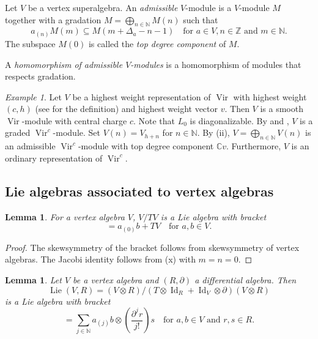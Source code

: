 \documentclass[a4paper, 12pt, reqno]{amsart}
\newtheorem{lemma}[theorem]{Lemma}
\theoremstyle{remark}
\newtheorem{example}[theorem]{Example}
\numberwithin{equation}{subsection}
\DeclareMathOperator{\Vir}{Vir}
\DeclareMathOperator{\Id}{Id}
\DeclareMathOperator{\Lie}{Lie}
\begin{document}
Let $V$ be a vertex superalgebra.
An \emph{admissible} $V$-module is a $V$-module $M$ together with a gradation $M = \bigoplus_{n \in \mathbb{N}}M(n)$ such that
\begin{equation*}
  a_{(n)}M(m) \subseteq M(m + \Delta_a - n - 1) \quad \text{for }a \in V, n \in \mathbb{Z}\text{ and }m \in \mathbb{N}.
\end{equation*}
The subspace $M(0)$ is called the \emph{top degree component} of $M$.

A \emph{homomorphism of admissible $V$-modules} is a homomorphism of modules that respects gradation.

\begin{example}
  \label{exa:11}
  Let $V$ be a highest weight representation of $\Vir$ with highest weight $(c, h)$ (see  for the definition) and highest weight vector $v$.
  Then $V$ is a smooth $\Vir$-module with central charge $c$.
  Note that $L_0$ is diagonalizable.
  By  and , $V$ is a graded $\Vir^c$-module.
  Set $V(n) = V_{h + n}$ for $n \in \mathbb{N}$.
  By (ii), $V = \bigoplus_{n \in \mathbb{N}}V(n)$ is an admissible $\Vir^c$-module with top degree component $\mathbb{C}v$.
  Furthermore, $V$ is an ordinary representation of $\Vir^c$.
\end{example}

\subsection{Lie algebras associated to vertex algebras}
\label{sec:lie-algebr-assoc}

\begin{lemma}
  \label{lmm:12}
  For a vertex algebra $V$, $V/TV$ is a Lie algebra with bracket
  \begin{equation*}
    [a + TV, b + TV] = a_{(0)}b + TV \quad \text{for }a, b \in V.
  \end{equation*}
\end{lemma}

\begin{proof}
  The skewsymmetry of the bracket follows from skewsymmetry of vertex algebras.
  The Jacobi identity follows from (x) with $m = n = 0$.
\end{proof}

\begin{lemma}
  \label{lmm:13}
  Let $V$ be a vertex algebra and $(R, \partial)$ a differential algebra.
  Then
  \begin{equation*}
    \Lie(V, R) = (V \otimes R)/(T\otimes\Id_R + \Id_V\otimes\partial)(V \otimes R)
  \end{equation*}
  is a Lie algebra with bracket
  \begin{equation*}
    [a\otimes r, b\otimes s] = \sum_{j \in \mathbb{N}}a_{(j)}b\otimes\left(\frac{\partial^jr}{j!}\right)s \quad \text{for }a, b \in V\text{ and }r, s \in R.
  \end{equation*}
\end{lemma}
\end{document}
